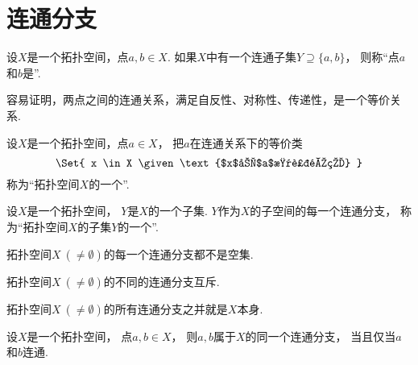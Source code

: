 \section{连通分支}
\begin{definition}
设\(X\)是一个拓扑空间，点\(a,b \in X\).
如果\(X\)中有一个连通子集\(Y \supseteq \{a,b\}\)，
则称“点\(a\)和\(b\)是”.
\end{definition}

容易证明，两点之间的连通关系，满足自反性、对称性、传递性，是一个等价关系.

\begin{definition}
设\(X\)是一个拓扑空间，点\(a \in X\)，
把\(a\)在连通关系下的等价类\begin{equation*}
	\Set{
		x \in X
		\given
		\text{$x$和$a$是连通的}
	}
\end{equation*}
称为“拓扑空间\(X\)的一个”.
\end{definition}

\begin{definition}
设\(X\)是一个拓扑空间，
\(Y\)是\(X\)的一个子集.
\(Y\)作为\(X\)的子空间的每一个连通分支，
称为“拓扑空间\(X\)的子集\(Y\)的一个”.
\end{definition}

\begin{proposition}
拓扑空间\(X\ (\neq\emptyset)\)的每一个连通分支都不是空集.
\end{proposition}

\begin{proposition}
拓扑空间\(X\ (\neq\emptyset)\)的不同的连通分支互斥.
\end{proposition}

\begin{proposition}
拓扑空间\(X\ (\neq\emptyset)\)的所有连通分支之并就是\(X\)本身.
\end{proposition}

\begin{proposition}
设\(X\)是一个拓扑空间，
点\(a,b \in X\)，
则\(a,b\)属于\(X\)的同一个连通分支，
当且仅当\(a\)和\(b\)连通.
\end{proposition}

